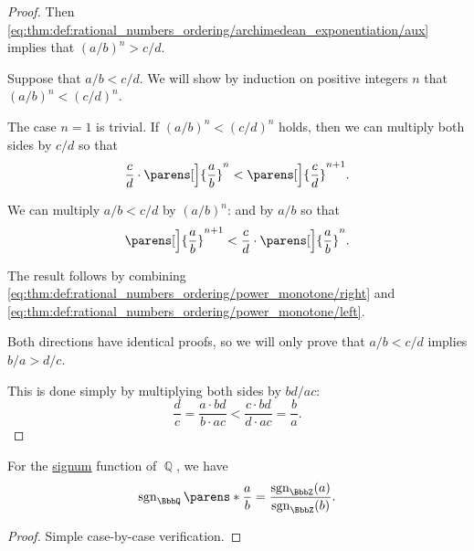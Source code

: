 \begin{proof}
  Then \eqref{eq:thm:def:rational_numbers_ordering/archimedean_exponentiation/aux} implies that \( (a / b)^n > c / d \).

   Suppose that \( a / b < c / d \). We will show by induction on positive integers \( n \) that \( (a / b)^n < (c / d)^n \).

  The case \( n = 1 \) is trivial. If \( (a / b)^n < (c / d)^n \) holds, then we can multiply both sides by \( c / d \) so that
  \begin{equation}\label{eq:thm:def:rational_numbers_ordering/power_monotone/right}
    \frac c d \cdot \parens[\Big]{ \frac a b }^n < \parens[\Big]{ \frac c d }^{n+1}.
  \end{equation}

  We can multiply \( a / b < c / d \) by \( (a / b)^n \):
  and by \( a / b \) so that
  \begin{equation}\label{eq:thm:def:rational_numbers_ordering/power_monotone/left}
    \parens[\Big]{ \frac a b }^{n + 1} < \frac c d \cdot \parens[\Big]{ \frac a b }^n.
  \end{equation}

  The result follows by combining \eqref{eq:thm:def:rational_numbers_ordering/power_monotone/right} and \eqref{eq:thm:def:rational_numbers_ordering/power_monotone/left}.

   Both directions have identical proofs, so we will only prove that \( a / b < c / d \) implies \( b / a > d / c \).

  This is done simply by multiplying both sides by \( {bd} / {ac} \):
  \begin{equation*}
    \frac d c = \frac {a \cdot bd} {b \cdot ac} < \frac {c \cdot bd} {d \cdot ac} = \frac b a.
  \end{equation*}
\end{proof}

\begin{proposition}\label{thm:rational_number_signum}\mimprovised
  For the \hyperref[def:totally_ordered_ring_signum]{signum} function of \( \BbbQ \), we have
  \begin{equation*}
    \sgn_\BbbQ\parens*{ \frac a b } = \frac {\sgn_\BbbZ(a)} {\sgn_\BbbZ(b)}.
  \end{equation*}
\end{proposition}
\begin{proof}
  Simple case-by-case verification.
\end{proof}

